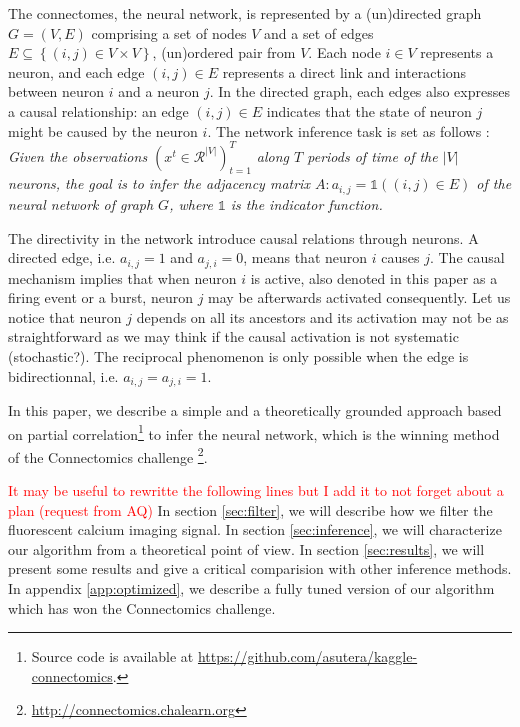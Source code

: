 \documentclass[wcp]{jmlr}
\begin{document}
The connectomes, the neural network, is represented by a (un)directed graph $G = (V, E)$ comprising
a set of nodes $V$ and a set of edges $E \subseteq \left\{(i, j) \in V \times
V\right\}$, (un)ordered pair from $V$.
Each node $i \in V$ represents a neuron, and each edge $(i, j) \in E$
represents a direct link and interactions between neuron $i$ and a neuron $j$.
In the directed graph, each edges also expresses a causal relationship: an
edge $(i, j) \in E$ indicates that the state of neuron $j$ might be caused
by the neuron $i$. The network inference task is set as follows :
\textit{Given the observations $(x^t \in \mathcal{R}^{|V|})_{t=1}^T $
along $T$ periods of time of the $|V|$ neurons, the goal is to infer the
adjacency matrix $A : a_{i,j} = \mathbb{1}((i, j) \in E)$ of the neural network
of graph $G$, where $\mathbb{1}$ is the indicator function.}

The directivity in the network introduce causal relations through neurons. A
directed edge, i.e. $a_{i,j} = 1$ and $a_{j,i} = 0$, means that neuron $i$
causes $j$. The causal mechanism implies that when neuron $i$ is active, also
denoted in this paper as a firing event or a burst, neuron $j$ may be
afterwards activated consequently. Let us notice that neuron $j$ depends on
all its ancestors and its activation may not be as straightforward as we may
think if the causal activation is not systematic (stochastic?). The reciprocal
phenomenon is only possible when the edge is bidirectionnal, i.e. $a_{i,j} =
a_{j,i} = 1$.


In this paper, we describe a simple and a theoretically grounded approach
based on partial correlation\footnote{Source code is available at
\url{https://github.com/asutera/kaggle-connectomics}.} to infer the neural
network, which is the winning method of the Connectomics challenge
\footnote{\url{http://connectomics.chalearn.org}}.

\textcolor{red}{It may be useful to rewritte the following lines but I add it to not forget about a plan (request from AQ)}
In section \ref{sec:filter}, we will describe how we filter the fluorescent calcium imaging signal.
In section \ref{sec:inference}, we will characterize our algorithm from a theoretical point of view.
In section \ref{sec:results}, we will present some results and give a critical comparision with other inference methods.
In appendix \ref{app:optimized}, we describe a fully tuned version of our algorithm which has won the Connectomics challenge.
\end{document}
